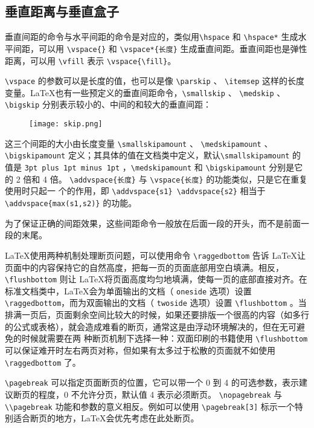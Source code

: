 \subsection{垂直距离与垂直盒子}

垂直间距的命令与水平间距的命令是对应的，类似用\verb|\hspace| 和 \verb|\hspace*| 生成水平间距，可以用 \verb|\vspace{}| 和 \verb|\vspace*{长度}| 生成垂直间距。垂直间距也是弹性距离，可以用 \verb|\vfill| 表示 \verb|\vspace{\fill}|。

\verb|\vspace| 的参数可以是长度的值，也可以是像 \verb|\parskip| 、 \verb|\itemsep| 这样的长度变量。\LaTeX 也有一些预定义的垂直间距命令，\verb|\smallskip| 、 \verb|\medskip| 、\verb|\bigskip| 分别表示较小的、中间的和较大的垂直间距：
\begin{figure}[H]
    \centering
    \texttt{[image: skip.png]}
\end{figure}

这三个间距的大小由长度变量 \verb|\smallskipamount| 、 \verb|\medskipamount| 、 \verb|\bigskipamount| 
定义；其具体的值在文档类中定义，默认\verb|\smallskipamount| 的值是 \verb|3pt plus 1pt minus 1pt| ，\verb|\medskipamount| 和 \verb|\bigskipamount| 分别是它的 2 倍和 4 倍。
\verb|\addvspace{长度}| 与 \verb|\vspace{长度}| 的功能类似，只是它在重复使用时只起一
个的作用，即 \verb|\addvspace{s1} \addvspace{s2}| 相当于 \verb|\addvspace{max(s1,s2)}|
的功能。

为了保证正确的间距效果，这些间距命令一般放在后面一段的开头，而不是前面一段的末尾。

\LaTeX 使用两种机制处理断页问题，可以使用命令 \verb|\raggedbottom| 告诉 \LaTeX 让页面中的内容保持它的自然高度，把每一页的页面底部用空白填满。相反，\verb|\flushbottom| 则让 \LaTeX 将页面高度均匀地填满，使每一页的底部直接对齐。在标准文档类中，\LaTeX 会为单面输出的文档（ \verb|oneside| 选项）设置 \verb|\raggedbottom|，而为双面输出的文档（ \verb|twoside| 选项）设置 \verb|\flushbottom| 。当排满一页后，页面剩余空间比较大的时候，如果还要排版一个很高的内容（如多行的公式或表格），就会造成难看的断页，通常这是由浮动环境解决的，但在无可避免的时候就需要在两
种断页机制下选择一种：双面印刷的书籍使用 \verb|\flushbottom| 可以保证难开时左右两页对称，但如果有太多过于松散的页面就不如使用 \verb|\raggedbottom| 了。

\verb|\pagebreak| 可以指定页面断页的位置，它可以带一个 0 到 4 的可选参数，表示建议断页的程度，0 不允许分页，默认值 4 表示必须断页。 \verb|\nopagebreak| 与 \verb|\\pagebreak| 功能和参数的意义相反。例如可以使用 \verb|\pagebreak[3]| 标示一个特别适合断页的地方，\LaTeX 会优先考虑在此处断页。

